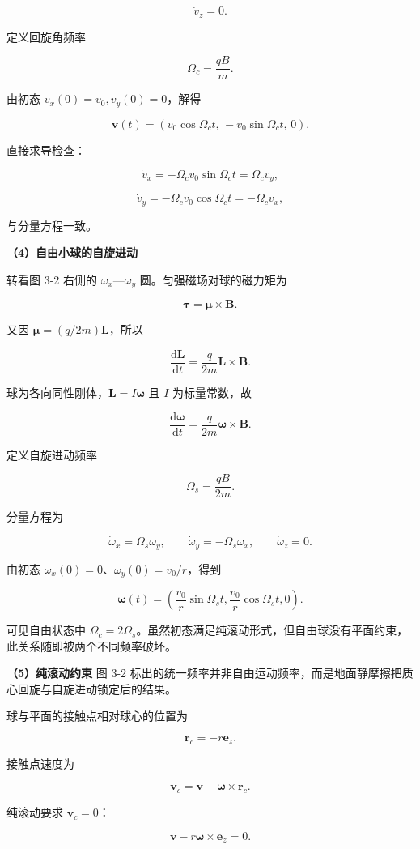 \documentclass[12pt,a4paper,UTF8]{ctexart}
\begin{document}
\[\dot v_z=0.\]

定义回旋角频率

\[\Omega_c=\frac{qB}{m}.\]

由初态 \(v_x(0)=v_0,v_y(0)=0\)，解得

\[\boxed{
\bm v(t)=
\left(v_0\cos\Omega_ct,\,-v_0\sin\Omega_ct,\,0\right)
}.\]

直接求导检查：

\[\dot v_x=-\Omega_cv_0\sin\Omega_ct=\Omega_cv_y,\]

\[\dot v_y=-\Omega_cv_0\cos\Omega_ct=-\Omega_cv_x,\]

与分量方程一致。

\textbf{（4）自由小球的自旋进动}

转看图 3-2 右侧的 \(\omega_x\)---\(\omega_y\) 圆。匀强磁场对球的磁力矩为

\[\bm\tau=\bm\mu\times\bm B.\]

又因 \(\bm\mu=(q/2m)\bm L\)，所以

\[\frac{\mathrm{d}\bm L}{\mathrm{d}t}=\frac{q}{2m}\bm L\times\bm B.\]

球为各向同性刚体，\(\bm L=I\bm\omega\) 且 \(I\) 为标量常数，故

\[\frac{\mathrm{d}\bm\omega}{\mathrm{d}t}=\frac{q}{2m}\bm\omega\times\bm B.\]

定义自旋进动频率

\[\Omega_s=\frac{qB}{2m}.\]

分量方程为

\[\dot\omega_x=\Omega_s\omega_y,\qquad
\dot\omega_y=-\Omega_s\omega_x,\qquad
\dot\omega_z=0.\]

由初态 \(\omega_x(0)=0\)、\(\omega_y(0)=v_0/r\)，得到

\[\boxed{
\bm\omega(t)=
\left(
\frac{v_0}{r}\sin\Omega_st,
\frac{v_0}{r}\cos\Omega_st,
0
\right)
}.\]

可见自由状态中
\(\Omega_c=2\Omega_s\)。虽然初态满足纯滚动形式，但自由球没有平面约束，此关系随即被两个不同频率破坏。

\textbf{（5）纯滚动约束} 图 3-2
标出的统一频率并非自由运动频率，而是地面静摩擦把质心回旋与自旋进动锁定后的结果。

球与平面的接触点相对球心的位置为

\[\bm r_c=-r\bm e_z.\]

接触点速度为

\[\bm v_c=\bm v+\bm\omega\times\bm r_c.\]

纯滚动要求 \(\bm v_c=0\)：

\[\bm v-r\bm\omega\times\bm e_z=0.\]
\end{document}
